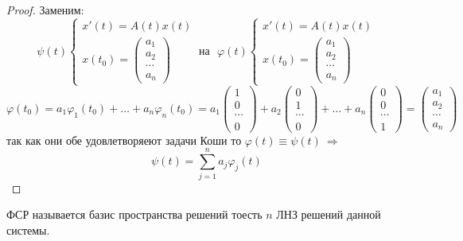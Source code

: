 \begin{proof}
  Заменим:
  $$
  \psi(t)
  \left\{
  \begin{array}{l}
  x'(t) = A(t)x(t)\\
  x(t_0) =
  \left(
  \begin{array}{c}
    a_1 \\
    a_2 \\
    \cdots \\
    a_n
  \end{array}
  \right)
  \end{array}
  \right. ~ \text{на} ~~~ \varphi(t)
  \left\{
  \begin{array}{c}
  x'(t) = A(t)x(t)\\
  x(t_0) =
  \left(
  \begin{array}{c}
    a_1 \\
    a_2 \\
    \cdots \\
    a_n
  \end{array}
  \right)
  \end{array}
  \right.
  $$
  $$
  \varphi(t_0) = a_1 \varphi_1(t_0) + \ldots + a_n \varphi_n(t_0) =
  a_1
  \left(
  \begin{array}{c}
    1 \\
    0 \\
    \cdots \\
    0
  \end{array}
  \right) +
  a_2
  \left(
  \begin{array}{c}
    0 \\
    1 \\
    \cdots \\
    0
  \end{array}
  \right) + \ldots +
  a_n
  \left(
  \begin{array}{c}
    0 \\
    0 \\
    \cdots \\
    1
  \end{array}
  \right) =
  \left(
  \begin{array}{c}
    a_1 \\
    a_2 \\
    \cdots \\
    a_n
  \end{array}
  \right)
  $$
  так как они обе удовлетворяеют задачи Коши то $\varphi(t) \equiv \psi(t) ~
  \Rightarrow$
  $$
  \psi(t) = \sum_{j=1}^n a_j \varphi_j(t)
  $$
\end{proof}

\begin{define}[ФСР]
  ФСР называется базис пространства решений тоесть $n$ ЛНЗ решений данной
  системы.
\end{define}


